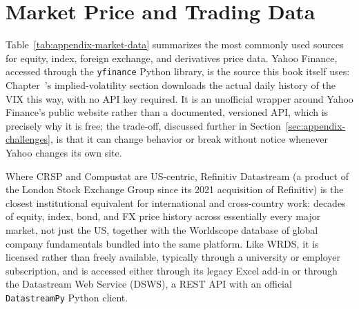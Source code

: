 \documentclass[../ai_in_finance]{subfiles}
\begin{document}
\section{Market Price and Trading Data}
\label{sec:appendix-market-data}

Table~\ref{tab:appendix-market-data} summarizes the most commonly used sources for equity, index, foreign exchange, and derivatives price data. Yahoo Finance, accessed through the \texttt{yfinance} Python library, is the source this book itself uses: Chapter~'s implied-volatility section downloads the actual daily history of the VIX this way, with no API key required. It is an unofficial wrapper around Yahoo Finance's public website rather than a documented, versioned API, which is precisely why it is free; the trade-off, discussed further in Section~\ref{sec:appendix-challenges}, is that it can change behavior or break without notice whenever Yahoo changes its own site.

Where CRSP and Compustat are US-centric, Refinitiv Datastream (a product of the London Stock Exchange Group since its 2021 acquisition of Refinitiv) is the closest institutional equivalent for international and cross-country work: decades of equity, index, bond, and FX price history across essentially every major market, not just the US, together with the Worldscope database of global company fundamentals bundled into the same platform. Like WRDS, it is licensed rather than freely available, typically through a university or employer subscription, and is accessed either through its legacy Excel add-in or through the Datastream Web Service (DSWS), a REST API with an official \texttt{DatastreamPy} Python client.
\end{document}
